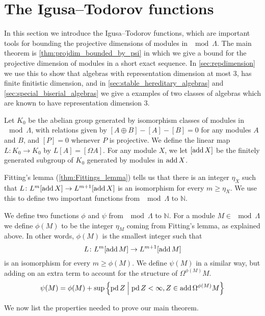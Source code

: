 \section{The Igusa--Todorov functions} \label{sec:Igusa-Todorov}

In this section we introduce the Igusa--Todorov functions, which are important tools for bounding the projective dimensions of modules in $\mod \Lambda$. The main theorem is \cref{thm:projdim_bounded_by_psi} in which we give a bound for the projective dimension of modules in a short exact sequence. In \cref{sec:repdimension} we use this to show that algebras with representation dimension at most 3, has finite finitistic dimension, and in \cref{sec:stable_hereditary_algebras} and \cref{sec:special_biserial_algebras} we give a examples of two classes of algebras which are known to have representation dimension 3.

Let $K_0$ be the abelian group generated by isomorphism classes of modules in $\mod\Lambda$, with relations given by $[A\oplus B] - [A] - [B] = 0$ for any modules $A$ and $B$, and $[P]=0$ whenever $P$ is projective. We define the linear map $L\colon K_0\to K_0$ by $L[A] = [\Omega A]$. For any module $X$, we let $[\operatorname{add} X]$ be the finitely generated subgroup of $K_0$ generated by modules in $\operatorname{add} X$. 

Fitting's lemma (\cref{thm:Fittings_lemma}) tells us that there is an integer $\eta_X$ such that $L\colon L^m[\operatorname{add} X] \to L^{m+1}[\operatorname{add} X]$ is an isomorphism for every $m \geq \eta_X$. We use this to define two important functions from $\mod \Lambda$ to $\mathbb N$.

\begin{defn}
	We define two functions $\phi$ and $\psi$ from $\mod\Lambda$ to $\mathbb N$. For a module $M \in \mod\Lambda$ we define $\phi(M)$ to be the integer $\eta_M$ coming from Fitting's lemma, as explained above. In other words, $\phi(M)$ is the smallest integer such that $$L\colon L^m[\operatorname{add} M] \to L^{m+1}[\operatorname{add} M]$$ is an isomorphism for every $m \geq \phi(M)$. We define $\psi(M)$ in a similar way, but adding on an extra term to account for the structure of $\Omega^{\phi(M)}M$. 
	$$\psi(M) = \phi(M) + \sup\left\lbrace\operatorname{pd} Z \; \middle| \; \operatorname{pd} Z < \infty, Z \in \operatorname{add} \Omega^{\phi(M)}M\right\rbrace$$
\end{defn}

We now list the properties needed to prove our main theorem.

